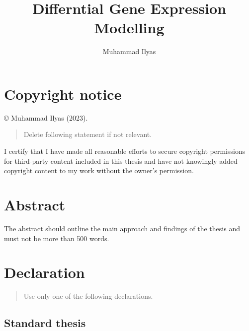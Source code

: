 \documentclass{uniexeterthesis}
\author{Muhammad Ilyas}
\title{Differntial Gene Expression Modelling}
\begin{document}

\titlepage

{\sf\tighttoc\doublespacing}


\hypertarget{copyright-notice}{%
\chapter*{Copyright notice}\label{copyright-notice}}


© Muhammad Ilyas (2023).

\begin{quote}
Delete following statement if not relevant.
\end{quote}

I certify that I have made all reasonable efforts to secure copyright
permissions for third-party content included in this thesis and have not
knowingly added copyright content to my work without the owner's
permission.


\hypertarget{abstract}{%
\chapter*{Abstract}\label{abstract}}


The abstract should outline the main approach and findings of the thesis
and must not be more than 500 words.


\hypertarget{declaration}{%
\chapter*{Declaration}\label{declaration}}


\begin{quote}
Use only one of the following declarations.
\end{quote}

\hypertarget{standard-thesis}{%
\section*{Standard thesis}\label{standard-thesis}}
\end{document}
